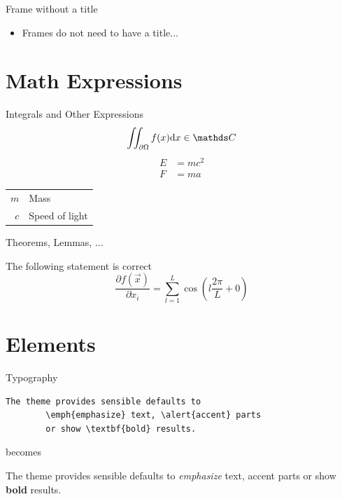 \begin{frame}
	Frame without a title
	\begin{itemize}
		\item Frames do not need to have a title...
	\end{itemize}
\end{frame}

\section{Math Expressions}
\begin{frame}{Integrals and Other Expressions}
	\begin{equation}
		\iint_{\partial\Omega}f(x)\diff{x} \in \complexes
	\end{equation}
	\begin{align}
		E &= mc^2\\
		F &= ma
	\end{align}

	\seprule
	
	\begin{tabular}{rl}
		$m$ & Mass\\
		$c$ & Speed of light
	\end{tabular}
\end{frame}
\begin{frame}{Theorems, Lemmas, ...}
	\begin{thm}
		The following statement is correct
		\begin{equation}
			\frac{\partial f(\vec{x})}{\partial x_i} = \sum_{l=1}^{L}\cos\left(l\frac{2\pi}{L} + 0\right)
		\end{equation}
	\end{thm}
\end{frame}

\section{Elements}

\begin{frame}[fragile]{Typography}
	\begin{verbatim}The theme provides sensible defaults to
		\emph{emphasize} text, \alert{accent} parts
		or show \textbf{bold} results.\end{verbatim}
	
	\begin{center}becomes\end{center}
	
	The theme provides sensible defaults to \emph{emphasize} text,
	\alert{accent} parts or show \textbf{bold} results.
\end{frame}

